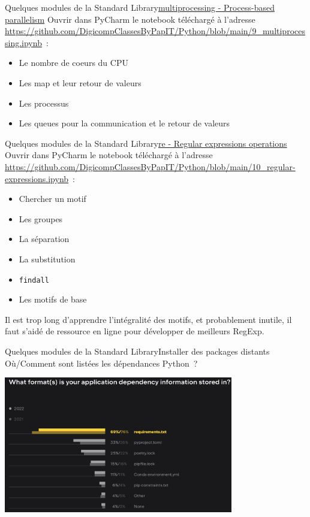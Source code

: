 \documentclass{beamer}
\begin{document}
    \begin{frame}{Quelques modules de la Standard Library}{\href{https://docs.python.org/3/library/multiprocessing.html}{multiprocessing - Process-based parallelism}}
        \bigbreak
        Ouvrir dans PyCharm le notebook téléchargé à l'adresse \url{https://github.com/DigicompClassesByPapIT/Python/blob/main/9_multiprocessing.ipynb}~:
        \begin{itemize}
            \item Le nombre de coeurs du CPU
            \item Les map et leur retour de valeurs
            \item Les processus
            \item Les queues pour la communication et le retour de valeurs
        \end{itemize}
    \end{frame}


    \begin{frame}{Quelques modules de la Standard Library}{\href{https://docs.python.org/fr/3/library/re.html}{re - Regular expressions operations}}
        \bigbreak
        Ouvrir dans PyCharm le notebook téléchargé à l'adresse \url{https://github.com/DigicompClassesByPapIT/Python/blob/main/10_regular-expressions.ipynb}~:
        \begin{itemize}
            \item Chercher un motif
            \item Les groupes
            \item La séparation
            \item La substitution
            \item \lstinline{findall}
            \item Les motifs de base
        \end{itemize}
        \begin{dangercolorbox}
            Il est trop long d'apprendre l'intégralité des motifs, et probablement inutile, il faut s'aidé de ressource en ligne pour développer de meilleurs RegExp.
        \end{dangercolorbox}
    \end{frame}


    \begin{frame}{Quelques modules de la Standard Library}{Installer des packages distants}
        Où/Comment sont listées les dépendances Python~?
        \begin{center}
            \includegraphics[width=10cm]{image/survey_dependency_listing}
        \end{center}
    \end{frame}
\end{document}
